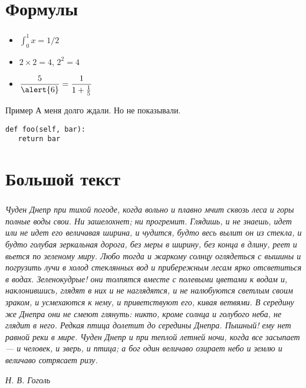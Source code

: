 \documentclass[t]{beamer}  %
\begin{document}
\section{Формулы}


\begin{frame}[fragile]
	\frametitle{\insertsection}
	\begin{itemize}
		\item $\displaystyle\int_0^1 x=1/2$  
		\item $2\times 2=4$, $2^2=4$ 
		\item $\displaystyle\frac{5}{\alert{6}}=\frac{1}{1+\frac{1}{5}}$ 
	\end{itemize}
    
    \begin{exampleblock}{Пример}
				А меня долго ждали. Но не показывали.
	\end{exampleblock}
    \begin{verbatim}
def foo(self, bar):
   return bar
\end{verbatim}

\end{frame}

\section{Большой текст}

\begin{frame}[shrink=7]\label{lab}  %
	\frametitle{\insertsection}
	\textsl{Чуден Днепр при тихой погоде, когда вольно и плавно мчит сквозь леса и горы полные воды свои. Ни зашелохнет; ни прогремит. Глядишь, и не знаешь, идет или не идет его величавая ширина, и чудится, будто весь вылит он из стекла, и будто голубая зеркальная дорога, без меры в ширину, без конца в длину, реет и вьется по зеленому миру. Любо тогда и жаркому солнцу оглядеться с вышины и погрузить лучи в холод стеклянных вод и прибережным лесам ярко отсветиться в водах. Зеленокудрые! они толпятся вместе с полевыми цветами к водам и, наклонившись, глядят в них и не наглядятся, и не налюбуются светлым  своим зраком, и усмехаются к нему, и приветствуют его, кивая ветвями. В середину же Днепра они не смеют глянуть: никто, кроме солнца и голубого неба, не глядит в него. Редкая птица долетит до середины Днепра. Пышный! ему нет равной реки в мире. Чуден Днепр и при теплой летней ночи, когда все засыпает --- и человек, и зверь, и птица; а бог один величаво озирает небо и землю и величаво сотрясает ризу.}

	\hfill{\textit{Н. В. Гоголь}}
\end{frame}
 
\end{document}
